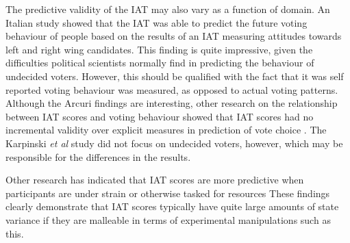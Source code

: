 The predictive validity of the IAT may also vary as a function of domain. An Italian study \cite{Arcuri2008} showed that the IAT was able to predict the future voting behaviour of people based on the results of an IAT measuring attitudes towards left and right wing candidates. This finding is quite impressive, given the difficulties political scientists normally find in predicting the behaviour of undecided voters. However, this should be qualified with the fact that it was self reported voting behaviour was measured, as opposed to actual voting patterns. Although the Arcuri findings are interesting, other research on  the relationship between IAT scores and voting behaviour showed that IAT scores had no incremental validity over explicit measures in prediction of vote choice \cite{Karpinski2005}. The Karpinski \textit{et al } study did not focus on undecided voters, however, which may be responsible for the differences in the results. 


Other research has indicated that IAT scores are more predictive when participants are under strain or otherwise tasked for resources \cite{Hofmann2008a} These findings clearly demonstrate that IAT scores typically have quite large amounts of state variance if they are malleable in terms of experimental manipulations such as this.  %


